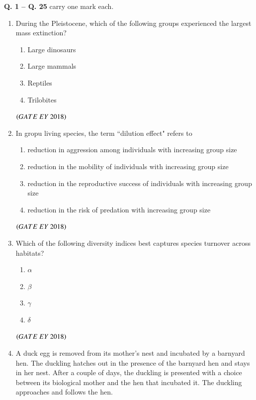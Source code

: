 \documentclass[journal]{IEEEtran}
\numberwithin{equation}{enumi}
\numberwithin{figure}{enumi}
\begin{document}
\newpage
\noindent \textbf{Q. 1 -- Q. \textbf{25}} carry one mark each.\\
\begin{enumerate}

\item During the Pleistocene, which of the following groups experienced the largest mass extinction?
    \begin{enumerate}
        \item Large dinosaurs
        \item Large mammals
        \item Reptiles
        \item Trilobites
    \end{enumerate}
    \hfill{$\brak{ GATE\ EY\ 2018}$}
    \bigskip
\item In gropu living species, the term ``dilution effect" refers to
    \begin{enumerate}
        \item reduction in aggression among individuals with increasing group size
        \item reduction in the mobility of individuals with increasing group size
        \item reduction in the reproductive success of individuals with increasing group size
        \item reduction in the risk of predation with increasing group size
    \end{enumerate}
    \hfill{$\brak{ GATE\ EY\ 2018}$}
    \bigskip
\item Which of the following diversity indices best captures species turnover across habitats?
\begin{multicols}{4}
    \begin{enumerate}
        \item $\alpha$
        \item $\beta$
        \item $\gamma$
        \item $\delta$
    \end{enumerate}
    \end{multicols}
    \hfill{$\brak{ GATE\ EY\ 2018}$}
    \bigskip
\item A duck egg is removed from its mother's nest and incubated by a barnyard hen. The
duckling hatches out in the presence of the barnyard hen and stays in her nest. After
a couple of days, the duckling is presented with a choice between its biological
mother and the hen that incubated it. The duckling approaches and follows the hen.

\end{enumerate}
\end{document}
